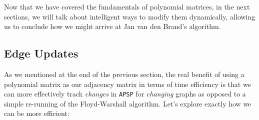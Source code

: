 \documentclass[12pt]{article}
\begin{document}
Now that we have covered the fundamentals of polynomial matrices, in the next sections, we will talk about intelligent ways to modify them dynamically, allowing us to conclude how we might arrive at Jan van den Brand's algorithm.

\subsection{Edge Updates} \label{sec:3.4}

As we mentioned at the end of the previous section, the real benefit of using a polynomial matrix as our adjacency matrix in terms of time efficiency is that we can more effectively track \emph{changes} in \texttt{APSP} for \emph{changing} graphs as opposed to a simple re-running of the Floyd-Warshall algorithm. Let's explore exactly how we can be more efficient:
\end{document}
